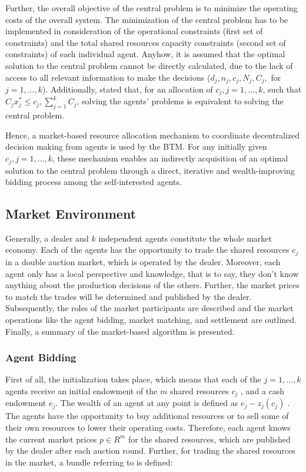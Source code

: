 Further, the overall objective of the central problem is to minimize the operating costs of the overall system. The minimization of the central problem
has to be implemented in consideration of the operational constraints 
(first set of constraints) and the total shared resources capacity constraints (second set of constraints) of each individual agent. 
Anyhow, it is assumed that the optimal solution to the central problem cannot be directly calculated, due to the lack of access to all relevant
information to make the decisions ($d_{j}, n_{j}, c_{j}, N_{j}, C_{j},$ for $j=1, ..., k$). 
Additionally,  stated that, for an allocation of 
$c_{j}, j=1, ..., k$, such that $C_{j}x_{j}^{*} \leq c_{j}, \sum\limits_{j=1}^{k} C_{j}$, 
solving the agents’ problems is equivalent to solving the central problem.

Hence, a market-based resource allocation mechanism to coordinate decentralized
decision making from agents is used by the BTM. 
For any initially given $c_{j}, j=1, ..., k$, these mechanism enables an indirectly
acquisition of an optimal solution to the central problem through a direct, iterative and
wealth-improving bidding process among the self-interested agents. 


\subsection{Market Environment}
Generally, a dealer and $k$ independent agents constitute the whole market economy. 
Each of the agents has the opportunity to trade the shared resources $c_{j}$ 
in a double auction market, which is operated by the dealer. Moreover, each agent only has a local perspective 
and knowledge, that is to say, they don't know anything about the production decisions of the others. 
Further, the market prices to match the trades will be determined and published by the dealer.
Subsequently, the roles of the market participants are described
and the market operations like the agent bidding, market matching, 
and settlement are outlined. Finally, a summary of the market-based algorithm is presented. 

\subsubsection{Agent Bidding}
\label{sec:agent_bidding}
First of all, the initialization takes place, which means that each of the $j=1, ..., k$ agents receive an initial
endowment of the $m$ shared resources $c_{j}$ , and a cash endowment $e_{j}$.
The wealth of an agent at any point is defined as $e_{j} - z_{j}(c_{j})$ .
The agents have the opportunity to buy additional resources or to sell some of their own resources to lower their operating costs. 
Therefore, each agent knows the current market prices $p \in R^{m}$ for the shared resources, 
which are published by the dealer after each auction round. Further, for trading the shared resources in the market, 
a bundle referring to  is defined:

